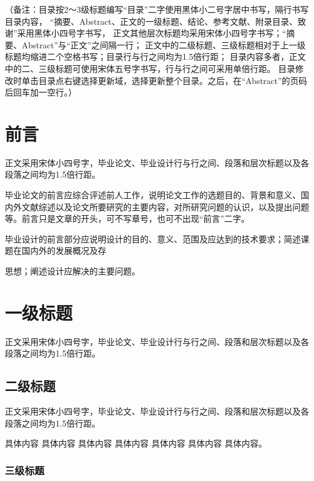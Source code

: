 \documentclass{sicnuthesis}
\begin{document}
\newpage

\tableofcontents

\vspace{1cm}


（备注：目录按2～3级标题编写“目录”二字使用黑体小二号字居中书写，隔行书写目录内容，
“摘要、Abstract、正文的一级标题、结论、参考文献、附录目录、致谢”采用黑体小四号字书写，
正文其他层次标题均采用宋体小四号字书写；“摘要、Abstract”与“正文”之间隔一行；
正文中的二级标题、三级标题相对于上一级标题均缩进二个空格书写；目录行与行之间均为1.5倍行距；
目录内容多者，正文中的二、三级标题可使用宋体五号字书写，行与行之间可采用单倍行距。
目录修改时单击目录点右键选择更新域，选择更新整个目录。之后，在“Abstract”的页码后回车加一空行。）

\newpage

\mainmatter %

\section{前言}

正文采用宋体小四号字，毕业论文、毕业设计行与行之间、段落和层次标题以及各段落之间均为1.5倍行距。

毕业论文的前言应综合评述前人工作，说明论文工作的选题目的、背景和意义、国内外文献综述以及论文所要研究的主要内容，对所研究问题的认识，以及提出问题等。前言只是文章的开头，可不写章号，也可不出现“前言”二字。

毕业设计的前言部分应说明设计的目的、意义、范围及应达到的技术要求；简述课题在国内外的发展概况及存

思想；阐述设计应解决的主要问题。

\section{一级标题}

正文采用宋体小四号字，毕业论文、毕业设计行与行之间、段落和层次标题以及各段落之间均为1.5倍行距。

\subsection{二级标题}

正文采用宋体小四号字，毕业论文、毕业设计行与行之间、段落和层次标题以及各段落之间均为1.5倍行距。

具体内容 具体内容 具体内容 具体内容 具体内容 具体内容 具体内容。\cite{cite1}

\subsubsection{三级标题}
\end{document}
